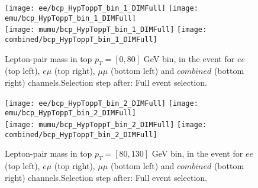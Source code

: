 % 
% 

\begin{figure}
  \texttt{[image: ee/bcp\_HypToppT\_bin\_1\_DIMFull]}
  \texttt{[image: emu/bcp\_HypToppT\_bin\_1\_DIMFull]}\\
  \texttt{[image: mumu/bcp\_HypToppT\_bin\_1\_DIMFull]}
  \texttt{[image: combined/bcp\_HypToppT\_bin\_1\_DIMFull]}
\caption{Lepton-pair mass in top $p_T = [0,80]$ GeV bin, in the event for $ee$ (top left), $e\mu$ (top right), $\mu\mu$ (bottom left) and $combined$ (bottom right) channels.\newline Selection step after: Full event selection.}
\end{figure}

\clearpage
\newpage


\begin{figure}
  \texttt{[image: ee/bcp\_HypToppT\_bin\_2\_DIMFull]}
  \texttt{[image: emu/bcp\_HypToppT\_bin\_2\_DIMFull]}\\
  \texttt{[image: mumu/bcp\_HypToppT\_bin\_2\_DIMFull]}
  \texttt{[image: combined/bcp\_HypToppT\_bin\_2\_DIMFull]}
\caption{Lepton-pair mass in top $p_T = [80,130]$ GeV bin, in the event for $ee$ (top left), $e\mu$ (top right), $\mu\mu$ (bottom left) and $combined$ (bottom right) channels.\newline Selection step after: Full event selection.}
\end{figure}

